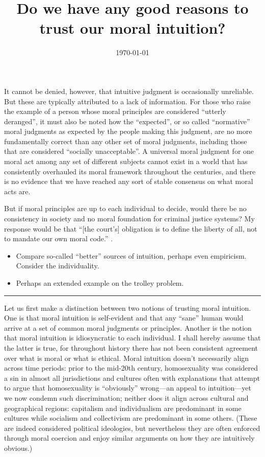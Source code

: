 \documentclass{scrartcl}
\title{Do we have any good reasons to trust our moral intuition?}
\author{\today}
\date{}
\begin{document}
\maketitle

It cannot be denied, however, that intuitive judgment is occasionally
unreliable. But these are typically attributed to a lack of information.
For those who raise the example of a person whose moral principles are
considered ``utterly deranged'', it must also be noted how the
``expected'', or so called ``normative'' moral judgments as expected by
the people making this judgment, are no more fundamentally correct than
any other set of moral judgments, including those that are considered
``socially unacceptable''. A universal moral judgment for one moral act
among any set of different subjects cannot exist in a world that has
consistently overhauled its moral framework throughout the centuries,
and there is no evidence that we have reached any sort of stable
consensus on what moral acts are.

But if moral principles are up to each individual to decide, would there
be no consistency in society and no moral foundation for criminal
justice systems? My response would be that ``[the court's]
obligation is to define the liberty of all, not to mandate our own moral
code.'' \autocite[]{casey}.

\begin{itemize}
\item
  Compare so-called ``better'' sources of intuition, perhaps even
  empiricism. Consider the individuality.
\item
  Perhaps an extended example on the trolley problem.
\end{itemize}

\begin{center}\rule{0.5\linewidth}{0.5pt}\end{center}

Let us first make a distinction between two notions of trusting moral
intuition. One is that moral intuition is self-evident and that any
``sane'' human would arrive at a set of common moral judgments or
principles. Another is the notion that moral intuition is idiosyncratic
to each individual. I shall hereby assume that the latter is true, for
throughout history there has not been consistent agreement over what is
moral or what is ethical. Moral intuition doesn't necessarily align
across time periods: prior to the mid-20th century, homosexuality was
considered a sin in almost all jurisdictions and cultures often with
explanations that attempt to argue that homosexuality is ``obviously''
wrong---an appeal to intuition---yet we now condemn such discrimination;
neither does it align across cultural and geographical regions:
capitalism and individualism are predominant in some cultures while
socialism and collectivism are predominant in some others. (These are
indeed considered political ideologies, but nevertheless they are often
enforced through moral coercion and enjoy similar arguments on how they
are intuitively obvious.)
\end{document}
